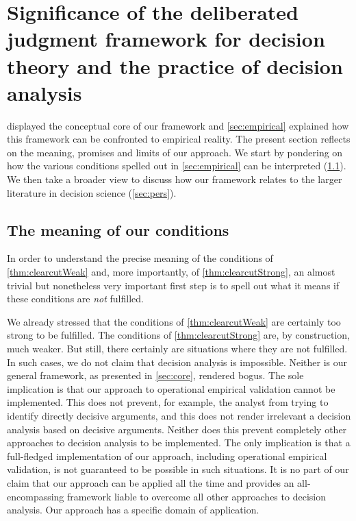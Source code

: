\documentclass[version=3.21, pagesize, twoside=off, bibliography=totoc, DIV=calc, fontsize=12pt, a4paper]{scrartcl}
\begin{document}
\section{Significance of the deliberated judgment framework for decision theory and the practice of decision analysis}
\label{sec:discussion}
 displayed the conceptual core of our framework and \cref{sec:empirical} explained how this framework can be confronted to empirical reality. The present section reflects on the meaning, promises and limits of our approach. We start by pondering on how the various conditions spelled out in \cref{sec:empirical} can be interpreted (\cref{sec:meaning}). We then take a broader view to discuss how our framework relates to the larger literature in decision science (\cref{sec:pers}).

\subsection{The meaning of our conditions}
\label{sec:meaning}
In order to understand the precise meaning of the conditions of \cref{thm:clearcutWeak} and, more importantly, of \cref{thm:clearcutStrong}, an almost trivial but nonetheless very important first step is to spell out what it means if these conditions are \emph{not} fulfilled.

We already stressed that the conditions of \cref{thm:clearcutWeak} are certainly too strong to be fulfilled. The conditions of \cref{thm:clearcutStrong} are, by construction, much weaker. But still, there certainly are situations where they are not fulfilled. In such cases, we do not claim that decision analysis is impossible. Neither is our general framework, as presented in \cref{sec:core}, rendered bogus. The sole implication is that our approach to operational empirical validation cannot be implemented. This does not prevent, for example, the analyst from trying to identify directly decisive arguments, and this does not render irrelevant a decision analysis based on decisive arguments. Neither does this prevent completely other approaches to decision analysis to be implemented. The only implication is that a full-fledged implementation of our approach, including operational empirical validation, is not guaranteed to be possible in such situations. It is no part of our claim that our approach can be applied all the time and provides an all-encompassing framework liable to overcome all other approaches to decision analysis. Our approach has a specific domain of application.
\end{document}
